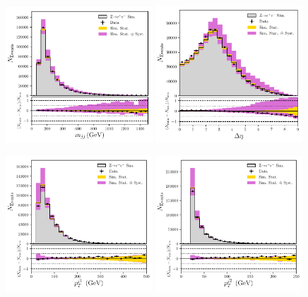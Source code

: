 \begin{figure}[h!]
    \begin{center}
        \includegraphics[width=0.49\textwidth]{figures/appendix_zee/dijet_mass_zee_LPS.pdf}
        \includegraphics[width=0.49\textwidth]{figures/appendix_zee/delta_eta_zee_LPS.pdf}
    \end{center}
    \begin{center}
        \includegraphics[width=0.49\textwidth]{figures/appendix_zee/lead_jet_pt_zee_LPS.pdf}
        \includegraphics[width=0.49\textwidth]{figures/appendix_zee/sublead_jet_pt_zee_LPS.pdf}

\end{center}
\end{figure}

